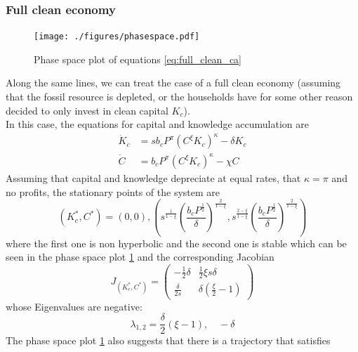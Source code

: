 \newpage

\subsubsection{Full clean economy}
\begin{figure}
	\vspace{-1.5 cm}
	\texttt{[image: ./figures/phasespace.pdf]}
	\caption{Phase space plot of equations \eqref{eq:full_clean_ca} \label{phase_space_plot}}
\end{figure}
Along the same lines, we can treat the case of a full clean economy (assuming that the fossil resource is depleted, or the households have for some other reason decided to only invest in clean capital $K_c$). \\
In this case, the equations for capital and knowledge accumulation are
\begin{align}
	\dot{K}_c &= s b_c P^{\pi} (C^\xi K_c)^{\kappa} - \delta K_c \\
	\dot{C} &= b_c P^\pi (C^\xi K_c)^\kappa - \chi C
	\label{eq:full_clean_ca}
\end{align}
Assuming that capital and knowledge depreciate at equal rates, that $\kappa = \pi$ and no profits, the stationary points of the system are 
\begin{equation}
	(K_c^*, C^*) = (0,0), \left(s^{\frac{1}{1-\xi}}\left( \frac{b_cP^{\frac{1}{2}}}{\delta} \right)^{\frac{2}{1-\xi}}, s^{\frac{2-\xi}{1-\xi}}\left( \frac{b_cP^{\frac{1}{2}}}{\delta} \right)^{\frac{2}{1-\xi}}  \right)
	\label{stationary_points}
\end{equation}
where the first one is non hyperbolic and the second one is stable which can be seen in the phase space plot \ref{phase_space_plot} and the corresponding Jacobian
\begin{equation}
	J_{(K_c^*,C^*)} = 
		\begin{pmatrix}
			-\frac{1}{2}\delta & \frac{1}{2}\xi s \delta \\
			\frac{\delta}{2 s} & \delta \left( \frac{\xi}{2}-1 \right)
		\end{pmatrix}
	\label{eq:learning_jacobian}
\end{equation}
whose Eigenvalues are negative:
\begin{equation}
	\lambda_{1,2} = \frac{\delta}{2}(\xi-1), \quad -\delta
	\label{eq:learning_eigenvalues}
\end{equation}
The phase space plot \ref{phase_space_plot} also suggests that there is a trajectory that satisfies 
